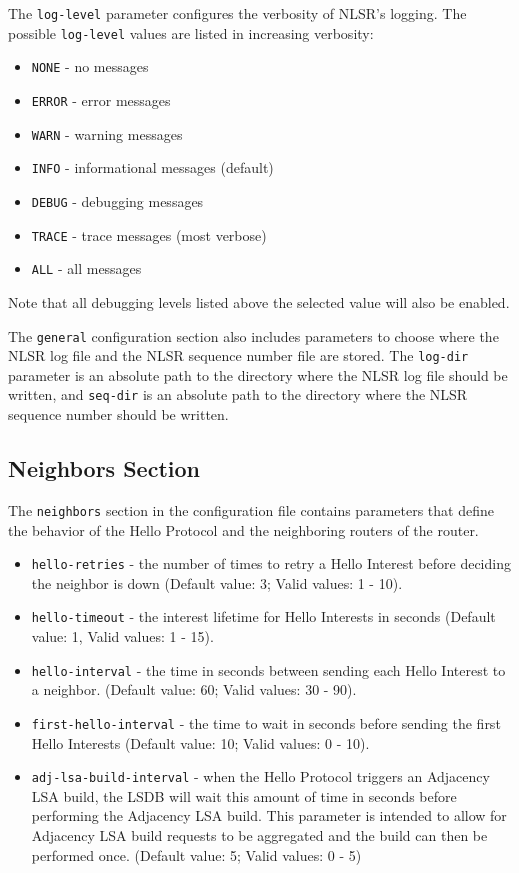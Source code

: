 The \texttt{log-level} parameter configures the verbosity of NLSR's logging.
The possible \texttt{log-level} values are listed in increasing verbosity:
\begin{itemize}
\item \texttt{NONE} - no messages
\item \texttt{ERROR} - error messages
\item \texttt{WARN} - warning messages
\item \texttt{INFO} - informational messages (default)
\item \texttt{DEBUG} - debugging messages
\item \texttt{TRACE} - trace messages (most verbose)
\item \texttt{ALL} - all messages
\end{itemize}
Note that all debugging levels listed above the selected value will also be enabled.

The \texttt{general} configuration section also includes parameters to choose where the NLSR log file and the NLSR sequence number file are stored.
The \texttt{log-dir} parameter is an absolute path to the directory where the NLSR log file should be written, and \texttt{seq-dir} is an absolute path to the directory where the NLSR sequence number should be written.

\subsection{Neighbors Section}

The \texttt{neighbors} section in the configuration file contains parameters that define the behavior of the Hello Protocol and the neighboring routers of the router.
\begin{itemize}
\item \texttt{hello-retries} - the number of times to retry a Hello Interest before deciding the neighbor is down (Default value: 3; Valid values: 1 - 10).
\item \texttt{hello-timeout} - the interest lifetime for Hello Interests in seconds (Default value: 1, Valid values: 1 - 15).
\item \texttt{hello-interval} - the time in seconds between sending each Hello Interest to a neighbor. (Default value: 60; Valid values: 30 - 90).
\item \texttt{first-hello-interval} -  the time to wait in seconds before sending the first Hello Interests (Default value: 10; Valid values: 0 - 10).
\item \texttt{adj-lsa-build-interval} - when the Hello Protocol triggers an Adjacency LSA build, the LSDB will wait this amount of time in seconds before performing the Adjacency LSA build. This parameter is intended to allow for Adjacency LSA build requests to be aggregated and the build can then be performed once. (Default value: 5; Valid values: 0 - 5)
\end{itemize}

